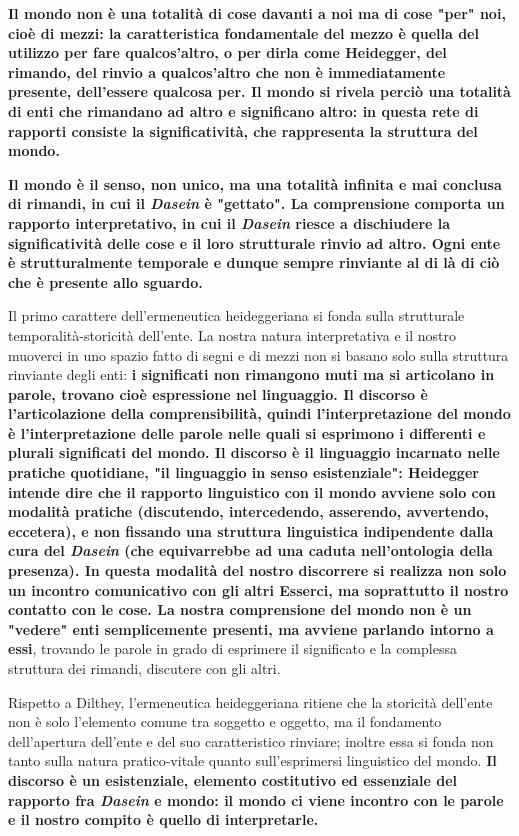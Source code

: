 \textbf{Il mondo non è una totalità di cose davanti a noi
ma di cose "per" noi, cioè di mezzi: la caratteristica
fondamentale del mezzo è quella del utilizzo per
fare qualcos'altro, o per dirla come Heidegger, del
rimando, del rinvio a qualcos'altro che non è
immediatamente presente, dell'essere qualcosa per.
Il mondo si rivela perciò una totalità di enti che
rimandano ad altro e significano altro: in questa
rete di rapporti consiste la significatività, che rappresenta la
struttura del mondo.}

\textbf{Il mondo è il senso, non unico, ma una totalità
infinita e mai conclusa di rimandi, in cui il \textit{Dasein}
è "gettato".
La comprensione comporta un rapporto interpretativo,
in cui il \textit{Dasein} riesce a dischiudere la
significatività delle cose e il loro strutturale
rinvio ad altro. Ogni ente è strutturalmente
temporale e dunque sempre rinviante al di là di
ciò che è presente allo sguardo.}

Il primo carattere dell'ermeneutica heideggeriana si fonda sulla strutturale
temporalità-storicità dell'ente.
La nostra natura interpretativa e il nostro muoverci in uno spazio fatto di segni e
di mezzi non si
basano solo sulla struttura rinviante degli enti:
\textbf{i significati non rimangono muti ma si
articolano in parole, trovano cioè espressione
nel linguaggio.
Il discorso è l'articolazione della comprensibilità,
quindi l'interpretazione del mondo è l'interpretazione delle parole nelle quali si esprimono i differenti e plurali significati del mondo.
Il discorso è il linguaggio incarnato nelle pratiche
quotidiane, "il linguaggio in senso esistenziale": Heidegger intende dire che
il rapporto linguistico con il mondo avviene solo con
modalità pratiche (discutendo, intercedendo, asserendo,
avvertendo, eccetera), e non fissando una struttura
linguistica indipendente dalla cura del \textit{Dasein}
(che equivarrebbe ad una caduta nell'ontologia
della presenza).
In questa modalità del nostro discorrere si realizza
non solo un incontro comunicativo con gli altri
Esserci, ma soprattutto il nostro contatto con le
cose. La nostra comprensione del mondo non
è un "vedere" enti semplicemente presenti, ma avviene
parlando intorno a essi}, trovando le parole in
grado di esprimere il significato e la complessa
struttura dei rimandi, discutere con gli altri.

Rispetto a Dilthey, l'ermeneutica heideggeriana
ritiene che la storicità dell'ente non è solo l'elemento
comune tra soggetto e oggetto, ma  il fondamento
dell'apertura dell'ente e del suo caratteristico
rinviare; inoltre essa si fonda non tanto sulla
natura pratico-vitale quanto sull'esprimersi
linguistico del mondo. 
\textbf{Il discorso è un
esistenziale, elemento costitutivo ed
essenziale del rapporto fra \textit{Dasein} e mondo:
il mondo ci viene incontro con le parole e
il nostro compito è quello di interpretarle.}

